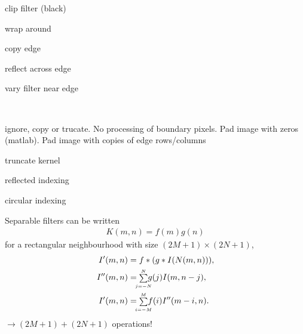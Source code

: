 \begin{compactdesc}
		\begin{enumerate*}[label=\protect\circled{\arabic*},itemjoin=]
			\item clip filter (black)\\
			\item wrap around\\
			\item copy edge\\
			\item reflect across edge\\
			\item vary filter near edge\\
		\end{enumerate*}
	\item[\lp{Filter at boundary}]\hfill\\
		\begin{enumerate*}[label=\protect\circled{\arabic*},itemjoin=]
			\item ignore, copy or trucate. No processing of boundary pixels. Pad image with zeros (matlab). Pad image with copies of edge rows/columns\\
			\item truncate kernel\\
			\item reflected indexing\\
			\item circular indexing\\
		\end{enumerate*}
	\item[\lp{Separable Kernels}] Separable filters can be written 
		\begin{gather*}
			K(m,n)=f(m)g(n)
		\end{gather*}
		for a rectangular neighbourhood with size $(2M+1)\times (2N+1)$,
		\begin{align*}
			I'(m,n)&=f*(g*I(N(m,n))),\\
			I''(m,n)&={\scriptstyle\sum\limits_{\mathclap{j=-N}}^{\mathclap{N}}}g(j)I(m,n-j),\\
			I'(m,n)&={\scriptstyle\sum\limits_{\mathclap{i=-M}}^{\mathclap{M}}}f(i)I''(m-i,n).
		\end{align*}
		$\to (2M+1)+(2N+1)$ operations!
	\item[\lp{Smoothing kernels (low-pass filters)}] 
		\begin{enumerate*}[label=\protect\circled{\arabic*},itemjoin=]
		\item Mean filter:\\ 
			$\displaystyle\frac{1}{9} \left(

\end{enumerate*}
\end{compactdesc}
